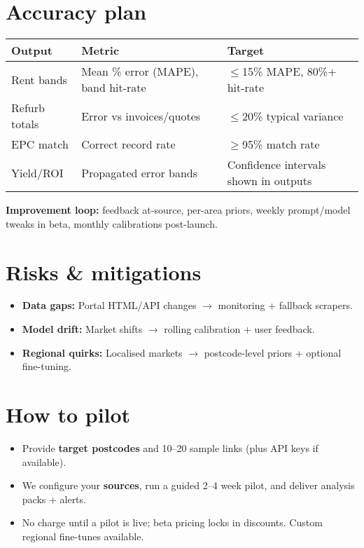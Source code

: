 \documentclass[11pt,a4paper]{article}
\begin{document}
\section*{Accuracy plan}
\begin{center}
\begin{tabularx}{\linewidth}{@{}p{3cm} X X@{}}
\toprule
\textbf{Output} & \textbf{Metric} & \textbf{Target}\\
\midrule
Rent bands & Mean \% error (MAPE), band hit-rate & $\leq$15\% MAPE, 80\%+ hit-rate \\
Refurb totals & Error vs invoices/quotes & $\leq$20\% typical variance \\
EPC match & Correct record rate & $\geq$95\% match rate \\
Yield/ROI & Propagated error bands & Confidence intervals shown in outputs \\
\bottomrule
\end{tabularx}
\end{center}

\noindent\textbf{Improvement loop:} feedback at-source, per-area priors, weekly prompt/model tweaks in beta, monthly calibrations post-launch.

\section*{Risks \& mitigations}
\begin{itemize}
  \item \textbf{Data gaps:} Portal HTML/API changes $\rightarrow$ monitoring + fallback scrapers.
  \item \textbf{Model drift:} Market shifts $\rightarrow$ rolling calibration + user feedback.
  \item \textbf{Regional quirks:} Localised markets $\rightarrow$ postcode-level priors + optional fine-tuning.
\end{itemize}

\section*{How to pilot}
\begin{itemize}
  \item Provide \textbf{target postcodes} and 10--20 sample links (plus API keys if available).
  \item We configure your \textbf{sources}, run a guided 2--4 week pilot, and deliver analysis packs + alerts.
  \item No charge until a pilot is live; beta pricing locks in discounts. Custom regional fine-tunes available.
\end{itemize}
\end{document}
